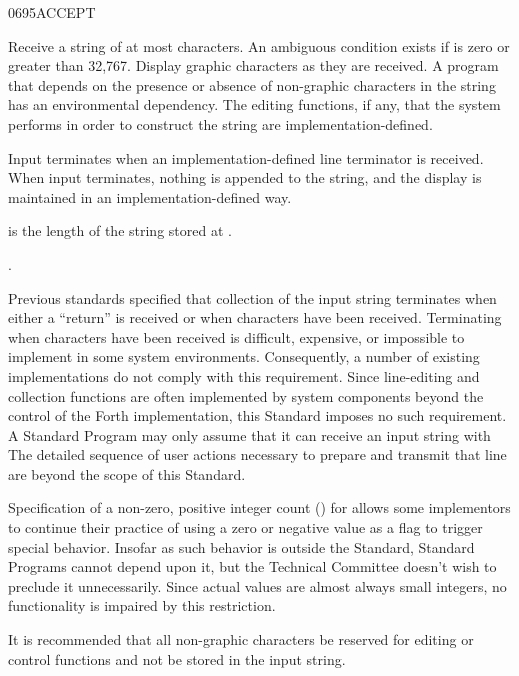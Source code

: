\begin{worddef}{0695}{ACCEPT}
\item {}

	Receive a string of at most  characters. An ambiguous
	condition exists if  is zero or greater than 32,767.
	Display graphic characters as they are received. A program that
	depends on the presence or absence of non-graphic characters in the
	string has an environmental dependency. The editing functions, if
	any, that the system performs in order to construct the string are
	implementation-defined.

	Input terminates when an implementation-defined line terminator is
	received. When input terminates, nothing is appended to the string,
	and the display is maintained in an implementation-defined way.

	 is the length of the string stored at .

\see {}.

	\begin{rationale} %
		Previous standards specified that collection of the input
		string terminates when either a ``return'' is received or when
		 characters have been received. Terminating when
		 characters have been received is difficult,
		expensive, or impossible to implement in some system environments.
		Consequently, a number of existing implementations do not
		comply with this requirement. Since line-editing and collection
		functions are often implemented by system components beyond the
		control of the Forth implementation, this Standard imposes no
		such requirement. A Standard Program may only assume that it
		can receive an input string with 
		The detailed sequence of user actions necessary to prepare and
		transmit that line are beyond the scope of this Standard.

		Specification of a non-zero, positive integer count ()
		for  allows some implementors to continue their
		practice of using a zero or negative value as a flag to trigger
		special behavior. Insofar as such behavior is outside the
		Standard, Standard Programs cannot depend upon it, but the
		Technical Committee doesn't wish to preclude it unnecessarily.
		Since actual values are almost always small integers, no
		functionality is impaired by this restriction.

		It is recommended that all non-graphic characters be reserved
		for editing or control functions and not be stored in the input
		string.


\end{rationale}
\end{worddef}
